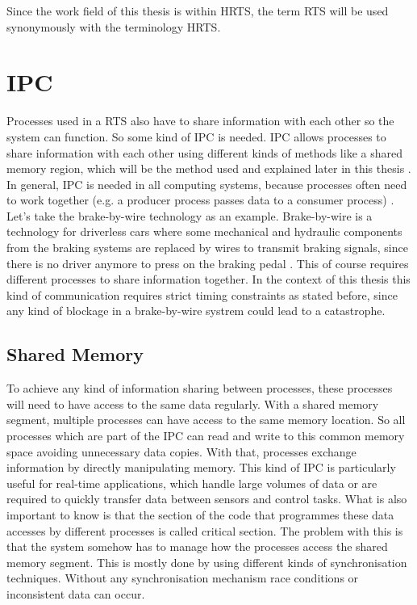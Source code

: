 Since the work field of this thesis is within \ac{HRTS}, the term \ac{RTS} will be used synonymously with the terminology \ac{HRTS}.

\section{\acf{IPC}}\label{sec:ipc}

Processes used in a \ac{RTS} also have to share information with each other so the system can function. So some kind of \ac{IPC} is needed. \ac{IPC} allows processes to share information with each other using different kinds of methods like a shared memory region, which will be the method used and explained later in this thesis \cite{IPCMechanisms}. In general, \ac{IPC} is needed in all computing systems, because processes often need to work together (e.g. a producer process passes data to a consumer process) \cite{IPCMechanisms}. Let's take the brake-by-wire technology as an example. Brake-by-wire is a technology for driverless cars where some mechanical and hydraulic components from the braking systems are replaced by wires to transmit braking signals, since there is no driver anymore to press on the braking pedal \cite{BrakeByWire}. This of course requires different processes to share information together. In the context of this thesis this kind of communication requires strict timing constraints as stated before, since any kind of blockage in a brake-by-wire systrem could lead to a catastrophe.

\subsection{Shared Memory}\label{subsec:shared-memory}

To achieve any kind of information sharing between processes, these processes will need to have access to the same data regularly. With a shared memory segment, multiple processes can have access to the same memory location. So all processes which are part of the \ac{IPC} can read and write to this common memory space avoiding unnecessary data copies. With that, processes exchange information by directly manipulating memory. This kind of \ac{IPC} is particularly useful for real-time applications, which handle large volumes of data or are required to quickly transfer data between sensors and control tasks. What is also important to know is that the section of the code that programmes these data accesses by different processes is called critical section. The problem with this is that the system somehow has to manage how the processes access the shared memory segment. This is mostly done by using different kinds of synchronisation techniques. Without any synchronisation mechanism race conditions or inconsistent data can occur. \cite{sharedmem}

